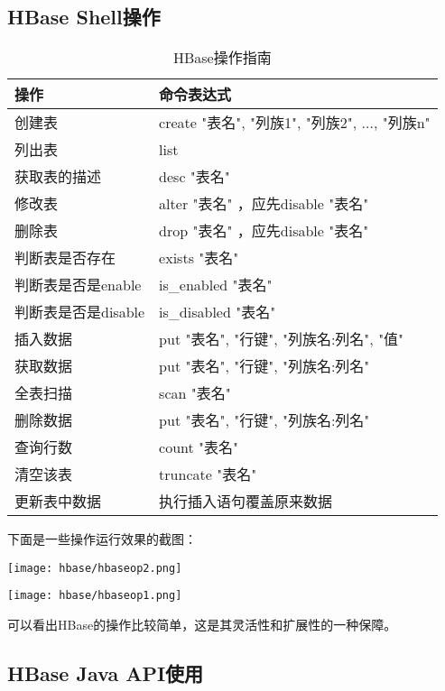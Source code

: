 \subsection{HBase Shell操作}
\begin{table}[htbp]
	\centering
	\caption{HBase操作指南}
	\begin{tabular}{p{4cm}|p{6cm}}
		\toprule
		操作 & 命令表达式 \\
		\midrule
		创建表 		& create "表名", "列族1", "列族2", \(\ldots\), "列族n"\\ \hline
		列出表 		& list \\ \hline
		获取表的描述 	& desc "表名" \\ \hline
		修改表 		& alter "表名" ，应先disable "表名"\\ \hline
		删除表 		& drop "表名" ，应先disable "表名"\\ \hline
		判断表是否存在 			& exists "表名"\\ \hline
		判断表是否是enable 		& is\_enabled "表名"\\ \hline
		判断表是否是disable 	& is\_disabled "表名"\\ \hline
		插入数据	& put "表名", "行键", "列族名:列名", "值" \\ \hline
		获取数据	& put "表名", "行键", "列族名:列名" \\ \hline
		全表扫描	& scan "表名" \\ \hline
		删除数据	& put "表名", "行键", "列族名:列名" \\ \hline
		查询行数	& count "表名" \\ \hline
		清空该表	& truncate "表名" \\ \hline
		更新表中数据	& 执行插入语句覆盖原来数据 \\ 
		\bottomrule
	\end{tabular}
	\label{tab:hbase_op}
\end{table}

下面是一些操作运行效果的截图：

\begin{center}
	\texttt{[image: hbase/hbaseop2.png]}

	\texttt{[image: hbase/hbaseop1.png]}

\end{center}

可以看出HBase的操作比较简单，这是其灵活性和扩展性的一种保障。

\subsection{HBase Java API使用}

